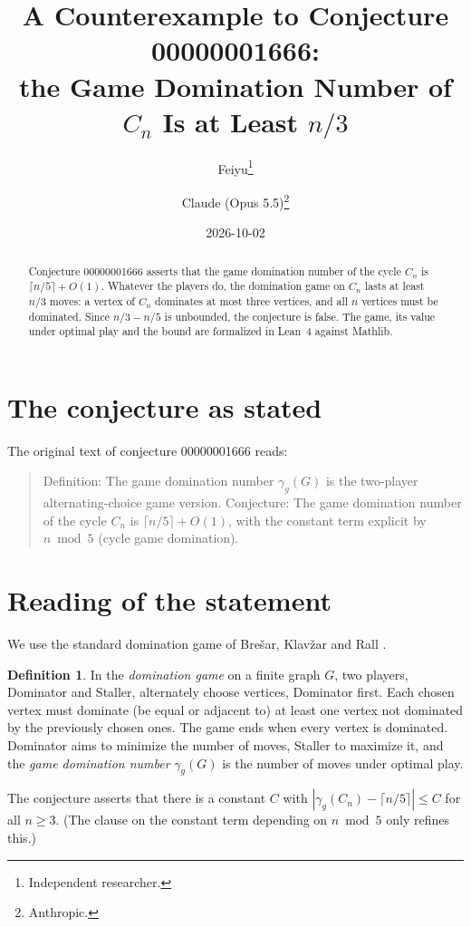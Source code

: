 \documentclass[11pt]{article}
\title{A Counterexample to Conjecture 00000001666:\\
the Game Domination Number of $C_n$ Is at Least $n/3$}
\author{%
  Feiyu\thanks{Independent researcher.}
  \and
  Claude (Opus 5.5)\thanks{Anthropic.}%
}
\date{2026-10-02}
\theoremstyle{plain}
\theoremstyle{definition}
\newtheorem{definition}[theorem]{Definition}
\theoremstyle{remark}
\begin{document}
\maketitle

\begin{abstract}
Conjecture 00000001666 asserts that the game domination number of the cycle
$C_n$ is $\lceil n/5\rceil+O(1)$. Whatever the players do, the domination game on
$C_n$ lasts at least $n/3$ moves: a vertex of $C_n$ dominates at most three
vertices, and all $n$ vertices must be dominated. Since $n/3-n/5$ is unbounded,
the conjecture is false. The game, its value under optimal play and the bound
are formalized in Lean~4 against Mathlib.
\end{abstract}

\section{The conjecture as stated}

The original text of conjecture 00000001666 reads:

\begin{quote}
Definition: The game domination number $\gamma_g(G)$ is the two-player
alternating-choice game version. Conjecture: The game domination number of the
cycle $C_n$ is $\lceil n/5\rceil + O(1)$, with the constant term explicit by $n
\bmod 5$ (cycle game domination).
\end{quote}

\section{Reading of the statement}

We use the standard domination game of Bre\v{s}ar, Klav\v{z}ar and Rall
\cite{bkr}.

\begin{definition}
In the \emph{domination game} on a finite graph $G$, two players, Dominator and
Staller, alternately choose vertices, Dominator first. Each chosen vertex must
dominate (be equal or adjacent to) at least one vertex not dominated by the
previously chosen ones. The game ends when every vertex is dominated. Dominator
aims to minimize the number of moves, Staller to maximize it, and the
\emph{game domination number} $\gamma_g(G)$ is the number of moves under optimal
play.
\end{definition}

The conjecture asserts that there is a constant $C$ with
$|\gamma_g(C_n)-\lceil n/5\rceil|\le C$ for all $n\ge3$. (The clause on the
constant term depending on $n\bmod5$ only refines this.)
\end{document}
